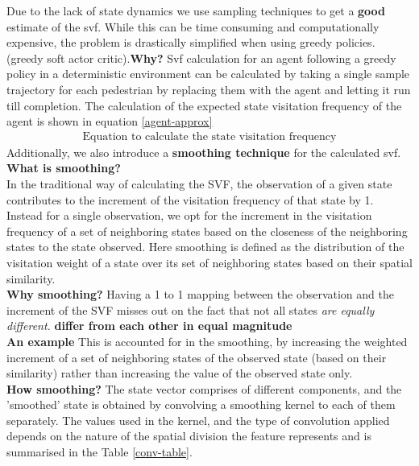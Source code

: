 Due to the lack of state dynamics we use sampling techniques to get a \textbf{good} estimate of the svf. While this can be time consuming and computationally expensive, the problem is drastically simplified when using greedy policies. (greedy soft actor critic).\textbf{Why?} 
Svf calculation for an agent following a greedy policy in a deterministic environment can be calculated by taking a single sample trajectory for each pedestrian by replacing them with the agent and letting it run till completion. The calculation of the expected state visitation frequency of the agent is shown in equation \ref{agent-approx}
\begin{align}
\label{agent-approx}
\text{Equation to calculate the state visitation frequency}
\end{align}
Additionally, we also introduce a \textbf{smoothing technique} for the calculated svf. \\
\textbf{What is smoothing?}\\
In the traditional way of calculating the SVF, the observation of a given state contributes to the increment of the visitation frequency of that state by 1. 
Instead for a single observation, we opt for the increment in the visitation frequency of a set of neighboring states based on the closeness of the neighboring states to the state observed. Here smoothing is defined as the distribution of the visitation weight of a state over its set of neighboring states based on their spatial similarity.\\
\textbf{Why smoothing?}
Having a 1 to 1 mapping between the observation and the increment of the SVF misses out on the fact that not all states \textit{are equally different.} \textbf{differ from each other in equal magnitude} \\
\textbf{An example}
This is accounted for in the smoothing, by increasing the weighted increment of a set of neighboring states of the observed state (based on their similarity) rather than increasing the value of the observed state only. \\ 
\textbf{How smoothing?}
The state vector comprises of different components, and the 'smoothed' state is obtained by convolving a smoothing kernel to each of them separately. The values used in the kernel, and the type of convolution applied depends on the nature of the spatial division the feature represents and is summarised in the Table \ref{conv-table}.


